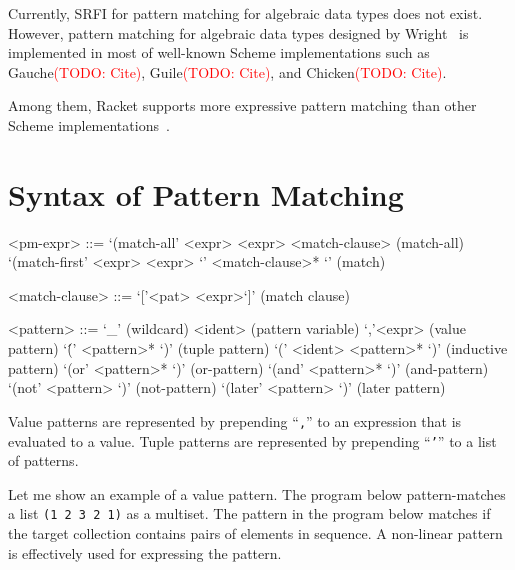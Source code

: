 \documentclass[acmlarge]{acmart}
\newcommand{\todo}[1]{\textcolor{red}{(TODO: #1)}}
\begin{document}

Currently, SRFI for pattern matching for algebraic data types does not exist.
However, pattern matching for algebraic data types designed by Wright~\cite{wright1993pattern} is implemented in most of well-known Scheme implementations such as Gauche\todo{Cite}, Guile\todo{Cite}, and Chicken\todo{Cite}.

Among them, Racket supports more expressive pattern matching than other Scheme implementations~\cite{tobin2011extensible}.


\section{Syntax of Pattern Matching}

\begin{grammar}
<pm-expr> ::= `(match-all' <expr> <expr> <match-clause>             \hfill (match-all)
  \alt `(match-first' <expr> <expr> `{' <match-clause>* `}'      \hfill (match)

<match-clause> ::= `['<pat> <expr>`]' \hfill (match clause)

<pattern> ::= `\_'                    \hfill (wildcard)
  \alt <ident>                        \hfill (pattern variable)
  \alt `,'<expr>                      \hfill (value pattern)
  \alt `\'(' <pattern>* `)'      \hfill (tuple pattern)
  \alt `(' <ident> <pattern>* `)'     \hfill (inductive pattern)
  \alt `(or' <pattern>* `)'      \hfill (or-pattern)
  \alt `(and' <pattern>* `)'     \hfill (and-pattern)
  \alt `(not' <pattern> `)'      \hfill (not-pattern)
  \alt `(later' <pattern> `)'    \hfill (later pattern)
\end{grammar}

Value patterns are represented by prepending ``\texttt{,}'' to an expression that is evaluated to a value.
Tuple patterns are represented by prepending ``\texttt{'}'' to a list of patterns.

Let me show an example of a value pattern.
The program below pattern-matches a list \texttt{(1 2 3 2 1)} as a multiset.
The pattern in the program below matches if the target collection contains pairs of elements in sequence.
A non-linear pattern is effectively used for expressing the pattern.
\end{document}

